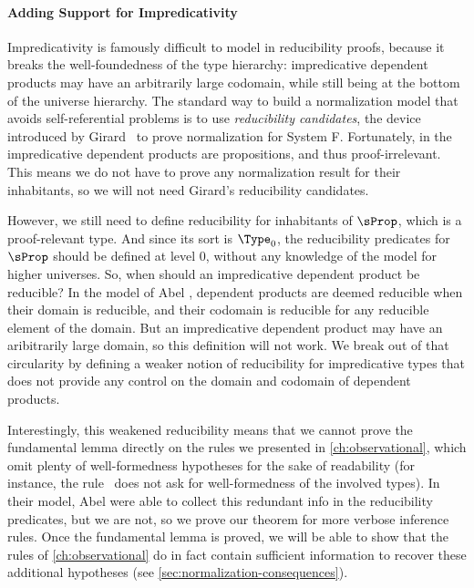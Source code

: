 \paragraph*{Adding Support for Impredicativity} 
% 
Impredicativity is famously difficult to model in reducibility proofs, because
it breaks the well-foundedness of the type hierarchy: impredicative dependent
products may have an arbitrarily large codomain, while still being at the 
bottom of the universe hierarchy.
% 
The standard way to build a normalization model that avoids self-referential
problems is to use \emph{reducibility candidates}, the device introduced by 
Girard~ to prove normalization for System F.
% 
Fortunately, in \SetoidCC the impredicative dependent products are 
propositions, and thus proof-irrelevant. This means we do not have to
prove any normalization result for their inhabitants, so we will not need
Girard's reducibility candidates.

However, we still need to define reducibility for inhabitants of \( \sProp \),
which is a proof-relevant type. And since its sort is \( \Type_0 \), the 
reducibility predicates for \( \sProp \) should be defined at level 0, without
any knowledge of the model for higher universes. 
% 
So, when should an impredicative dependent product be reducible?
% 
In the model of Abel \etal, dependent products are deemed reducible when
their domain is reducible, and their codomain is reducible 
for any reducible element of the domain. 
% 
But an impredicative dependent product may have an aribitrarily large domain,
so this definition will not work.
% 
We break out of that circularity by defining a weaker notion of reducibility 
for impredicative types that does not provide any control on the domain and 
codomain of dependent products.

Interestingly, this weakened reducibility means that we cannot prove the 
fundamental lemma directly on the rules we presented in \cref{ch:observational}, 
which omit plenty of well-formedness hypotheses for the sake of readability 
(for instance, the rule~ does not ask for 
well-formedness of the involved types).
% 
In their model, Abel \etal were able to collect this redundant info in the 
reducibility predicates, but we are not, so we prove our theorem for more
verbose inference rules.
% 
Once the fundamental lemma is proved, we will be able to show that the rules
of \cref{ch:observational} do in fact contain sufficient information to recover
these additional hypotheses (see \cref{sec:normalization-consequences}).

